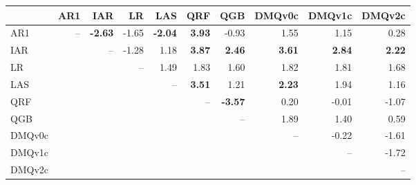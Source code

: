 \begin{tabular}{lrrrrrrrrr}
\toprule
 & AR1 & IAR & LR & LAS & QRF & QGB & DMQv0c & DMQv1c & DMQv2c \\
\midrule
AR1 & -- & \textbf{-2.63} & -1.65 & \textbf{-2.04} & \textbf{3.93} & -0.93 & 1.55 & 1.15 & 0.28 \\
IAR &  & -- & -1.28 & 1.18 & \textbf{3.87} & \textbf{2.46} & \textbf{3.61} & \textbf{2.84} & \textbf{2.22} \\
LR &  &  & -- & 1.49 & 1.83 & 1.60 & 1.82 & 1.81 & 1.68 \\
LAS &  &  &  & -- & \textbf{3.51} & 1.21 & \textbf{2.23} & 1.94 & 1.16 \\
QRF &  &  &  &  & -- & \textbf{-3.57} & 0.20 & -0.01 & -1.07 \\
QGB &  &  &  &  &  & -- & 1.89 & 1.40 & 0.59 \\
DMQv0c &  &  &  &  &  &  & -- & -0.22 & -1.61 \\
DMQv1c &  &  &  &  &  &  &  & -- & -1.72 \\
DMQv2c &  &  &  &  &  &  &  &  & -- \\
\bottomrule
\end{tabular}
